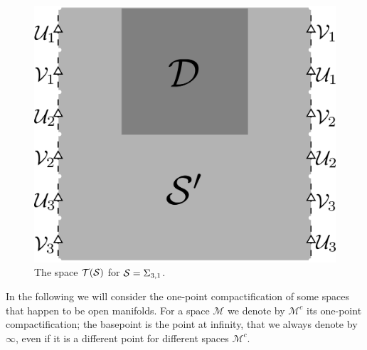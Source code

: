 \begin{figure}\centering
 \includegraphics[scale=0.7]{figures/defTS.png}
 \caption{The space $\T(\S)$ for $\S=\Sigma_{3,1}$.}
\label{fig:defTS}
\end{figure}

In the following we will consider the one-point compactification of some spaces that
happen to be open manifolds. For a space $\mathcal{M}$ we denote by $\mathcal{M}^c$ its one-point
compactification; the basepoint is the point at infinity, that we always denote by $\infty$, even
if it is a different point for different spaces $\mathcal{M}^c$.


